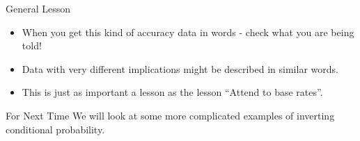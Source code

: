 \documentclass[
  ignorenonframetext,
]{beamer}
\providecommand{\tightlist}{%
  \setlength{\itemsep}{0pt}\setlength{\parskip}{0pt}}
\renewcommand{\,}{\text{, }}
\begin{document}
\begin{frame}{General Lesson}
\protect\hypertarget{general-lesson}{}
\begin{itemize}
\tightlist
\item
  When you get this kind of accuracy data in words - check what you are
  being told!
\item
  Data with very different implications might be described in similar
  words.
\item
  This is just as important a lesson as the lesson ``Attend to base
  rates''.
\end{itemize}
\end{frame}

\begin{frame}{For Next Time}
\protect\hypertarget{for-next-time}{}
We will look at some more complicated examples of inverting conditional
probability.
\end{frame}
\end{document}
